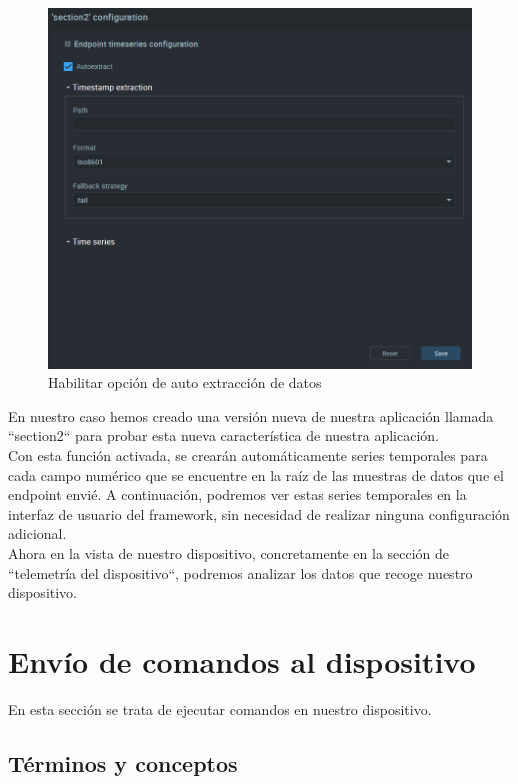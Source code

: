 \begin{figure}[hb!]
    \centering
    \includegraphics[width=\linewidth]{imagenes/autoextract-option.png}
    \caption{Habilitar opción de auto extracción de datos}
    \label{fig:figure10}
\end{figure}

En nuestro caso hemos creado una versión nueva de nuestra aplicación llamada ``section2`` para probar esta nueva característica de nuestra aplicación. \\

Con esta función activada, se crearán automáticamente series temporales para cada campo numérico que se encuentre en la raíz de las muestras de datos que el endpoint envié. A continuación, podremos ver estas series temporales en la interfaz de usuario del framework, sin necesidad de realizar ninguna configuración adicional. \\

Ahora en la vista de nuestro dispositivo, concretamente en la sección de ``telemetría del dispositivo``, podremos analizar los datos que recoge nuestro dispositivo.

\section{Envío de comandos al dispositivo}

En esta sección se trata de ejecutar comandos en nuestro dispositivo.

\subsection{Términos y conceptos}


